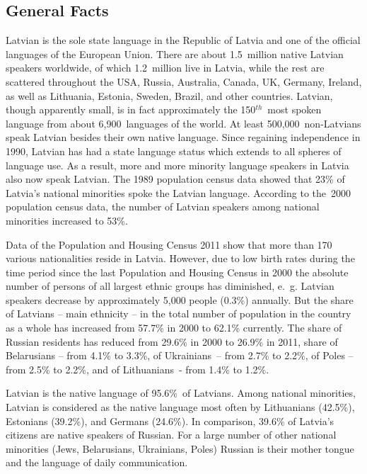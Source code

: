 \begin{multicols}{2}

\subsection{General Facts}


Latvian is the sole state language in the Republic of Latvia and one of the official languages of the European Union. There are about 1.5~million native Latvian speakers worldwide, of which 1.2~million live in Latvia, while the rest are scattered throughout the USA, Russia, Australia, Canada, UK, Germany, Ireland, as well as Lithuania, Estonia, Sweden, Brazil, and other countries.
Latvian, though apparently small, is in fact approximately the 150${}^{th}$~most spoken language from about 6,900~languages of the world.
At least 500,000~non-Latvians speak Latvian besides their own native language.
Since regaining independence in 1990, Latvian has had a state language status which extends to all spheres of language use.
As a result, more and more minority language speakers in Latvia also now speak Latvian.
The 1989 population census data showed that 23\% of Latvia's national minorities spoke the Latvian language.
According to the~2000 population census data, the number of Latvian speakers among national minorities increased to 53\%.

Data of the Population and Housing Census 2011 \cite{Meta54} show that more than 170 various nationalities reside in Latvia. 
However, due to low birth rates during the time period since the last Population and Housing Census in 2000 the absolute number of persons of all largest ethnic groups has diminished, e.~g. Latvian speakers decrease by approximately 5,000 people (0.3\%) annually. 
But the share of Latvians – main ethnicity – in the total number of population in the country as a whole has increased from 57.7\% in 2000 to 62.1\% currently. 
The share of Russian residents has reduced from 29.6\% in 2000 to 26.9\% in 2011, share of Belarusians – from 4.1\% to 3.3\%, of Ukrainians~– from 2.7\% to 2.2\%, of Poles – from 2.5\% to 2.2\%, and of Lithuanians~- from 1.4\% to 1.2\%.

Latvian is the native language of 95.6\%~of Latvians.
Among national minorities, Latvian is considered as the native language most often by Lithuanians (42.5\%), Estonians (39.2\%), and Germans (24.6\%).
In comparison, 39.6\% of Latvia's citizens are native speakers of Russian.
For a large number of other national minorities (Jews, Belarusians, Ukrainians, Poles) Russian is their mother tongue and the language of daily communication.


\end{multicols}
